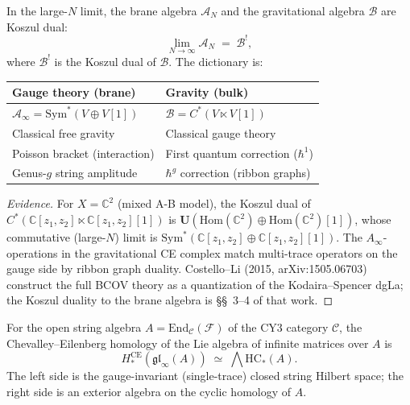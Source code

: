 \begin{conjecture}
\label{conj:phys-mth-koszul}
\ClaimStatusConjectured
In the large-$N$ limit, the brane algebra $\mathcal{A}_N$ and the gravitational algebra $\mathcal{B}$ are Koszul dual:
\[
\lim_{N \to \infty} \mathcal{A}_N \;=\; \mathcal{B}^!,
\]
where $\mathcal{B}^!$ is the Koszul dual of $\mathcal{B}$. The dictionary is:
\begin{center}
\renewcommand{\arraystretch}{1.4}
\begin{tabular}{ll}
\hline
\textbf{Gauge theory (brane)} & \textbf{Gravity (bulk)} \\
\hline
$\mathcal{A}_\infty = \mathrm{Sym}^*(V \oplus V[1])$ & $\mathcal{B} = C^*(V \ltimes V[1])$ \\
Classical free gravity & Classical gauge theory \\
Poisson bracket (interaction) & First quantum correction ($\hbar^1$) \\
Genus-$g$ string amplitude & $\hbar^g$ correction (ribbon graphs) \\
\hline
\end{tabular}
\end{center}
\end{conjecture}

\begin{proof}[Evidence]
For $X = \mathbb{C}^2$ (mixed A-B model), the Koszul dual of $C^*(\mathbb{C}[z_1, z_2] \ltimes \mathbb{C}[z_1,z_2][1])$ is $\mathbf{U}(\mathrm{Hom}(\mathbb{C}^2) \oplus \mathrm{Hom}(\mathbb{C}^2)[1])$, whose commutative (large-$N$) limit is $\mathrm{Sym}^*(\mathbb{C}[z_1, z_2] \oplus \mathbb{C}[z_1,z_2][1])$. The $A_\infty$-operations in the gravitational CE complex match multi-trace operators on the gauge side by ribbon graph duality. Costello--Li (2015, arXiv:1505.06703) construct the full BCOV theory as a quantization of the Kodaira--Spencer dgLa; the Koszul duality to the brane algebra is \S\S~3--4 of that work.
\end{proof}

\begin{theorem}
\label{thm:phys-lqt}
For the open string algebra $A = \mathrm{End}_{\mathcal{C}}(\mathcal{F})$ of the CY3 category $\mathcal{C}$, the Chevalley--Eilenberg homology of the Lie algebra of infinite matrices over $A$ is
\begin{equation}\label{eq:phys-lqt}
H_*^{\mathrm{CE}}(\mathfrak{gl}_\infty(A)) \;\simeq\; \bigwedge \mathrm{HC}_*(A).
\end{equation}
The left side is the gauge-invariant (single-trace) closed string Hilbert space; the right side is an exterior algebra on the cyclic homology of $A$.
\end{theorem}

